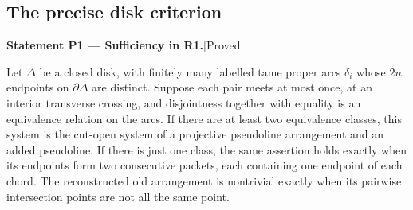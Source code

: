 \documentclass[11pt,a4paper]{article}
\newenvironment{resultenv}[3]{\par\medskip\phantomsection\label{#1}\noindent\textbf{Statement #1 --- #3.}\quad\textsf{[#2]}\par\smallskip\noindent\ignorespaces}{\par\medskip}
\begin{document}
\subsection{The precise disk criterion}

\begin{resultenv}{P1}{Proved}{Sufficiency in R1}
Let $\Delta$ be a closed disk, with finitely many labelled tame proper
arcs $\delta_i$ whose $2n$ endpoints on $\partial\Delta$ are distinct.
Suppose each pair meets at most once, at an interior transverse
crossing, and disjointness together with equality is an equivalence
relation on the arcs.  If there are at least two equivalence classes,
this system is the cut-open system of a projective pseudoline
arrangement and an added pseudoline.  If there is just one class,
the same assertion holds exactly when its endpoints form two
consecutive packets, each containing one endpoint of each chord.
The reconstructed old arrangement is nontrivial exactly when its
pairwise intersection points are not all the same point.
\end{resultenv}
\end{document}
